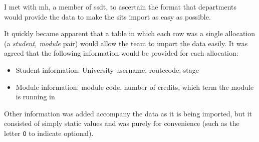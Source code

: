 I met with \gls{mh}, a member of \gls{ssdt}, to ascertain the format that
departments would provide the data to make the \gls{sits} import as easy as
possible.

It quickly became apparent that a table in which each row was a single
allocation (a \emph{student, module} pair) would allow the
team to import the data easily. It was agreed that the following information
would be provided for each allocation:

\begin{itemize}
  \item Student information: University username, \gls{routecode}, \gls{stage}
  \item Module information: module code, number of credits, which term the module is running in
\end{itemize}

Other information was added accompany the data as it is being imported, but it
consisted of simply static values and was purely for convenience (such as the
letter \texttt{O} to indicate optional).

